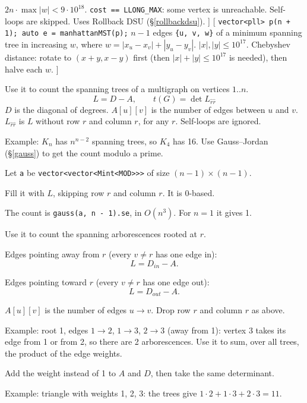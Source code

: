 	 $2n \cdot \max |w| < 9 \cdot 10^{18}$. \texttt{cost == LLONG\_MAX}: some vertex is unreachable. Self-loops are skipped. Uses Rollback DSU (\S\ref{rollbackdsu}).
]\label{dmst}
[
	 \texttt{vector<pll> p(n + 1); auto e = manhattanMST(p);}
	 $n - 1$ edges \texttt{\{u, v, w\}} of a minimum spanning tree in increasing $w$, where $w = |x_u - x_v| + |y_u - y_v|$.
	 $|x|, |y| \le 10^{17}$. Chebyshev distance: rotate to $(x + y, x - y)$ first (then $|x| + |y| \le 10^{17}$ is needed), then halve each $w$.
]\label{manhattanmst}
\label{matrixtree}
{\footnotesize\tightdisplay
{}
Use it to count the spanning trees of a multigraph on vertices $1..n$.
\[ L = D - A, \qquad t(G) = \det L_{\hat r \hat r} \]
$D$ is the diagonal of degrees. $A[u][v]$ is the number of edges between $u$ and $v$.
$L_{\hat r \hat r}$ is $L$ without row $r$ and column $r$, for any $r$. Self-loops are ignored.
\par Example: $K_n$ has $n^{n-2}$ spanning trees, so $K_4$ has 16.
Use Gauss--Jordan (\S\ref{gauss}) to get the count modulo a prime.
\begin{facts}
	\item Let \texttt{a} be \texttt{vector<vector<Mint<MOD>{}>{}>} of size $(n - 1) \times (n - 1)$.
	\item Fill it with $L$, skipping row $r$ and column $r$. It is 0-based.
	\item The count is \texttt{gauss(a, n - 1).se}, in $O(n^3)$. For $n = 1$ it gives 1.
\end{facts}
Use it to count the spanning arborescences rooted at $r$.
\begin{facts}
	\item Edges pointing away from $r$ (every $v \ne r$ has one edge in):
	\[ L = D_{in} - A. \]
	\item Edges pointing toward $r$ (every $v \ne r$ has one edge out):
	\[ L = D_{out} - A. \]
	\item $A[u][v]$ is the number of edges $u \to v$. Drop row $r$ and column $r$ as above.
\end{facts}
Example: root 1, edges $1 \to 2$, $1 \to 3$, $2 \to 3$ (away from 1): vertex 3 takes its edge from 1 or from 2, so there are 2 arborescences.
Use it to sum, over all trees, the product of the edge weights.
\begin{facts}
	\item Add the weight instead of 1 to $A$ and $D$, then take the same determinant.
\end{facts}
Example: triangle with weights 1, 2, 3: the trees give $1 \cdot 2 + 1 \cdot 3 + 2 \cdot 3 = 11$.
}

